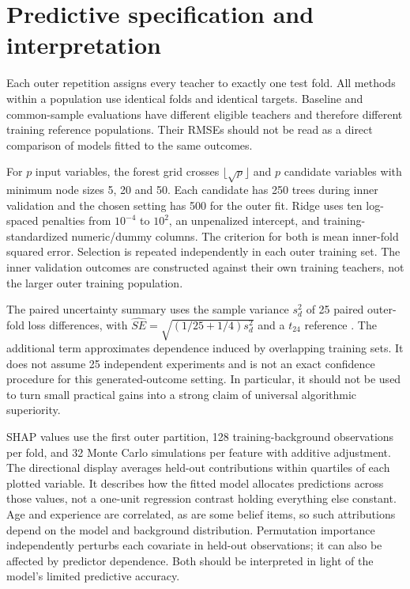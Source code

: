 \section{Predictive specification and interpretation}\label{app:prediction}
\begin{addition}
Each outer repetition assigns every teacher to exactly one test fold. All methods within a population use identical folds and identical targets. Baseline and common-sample evaluations have different eligible teachers and therefore different training reference populations. Their RMSEs should not be read as a direct comparison of models fitted to the same outcomes.

For $p$ input variables, the forest grid crosses $\lfloor\sqrt p\rfloor$ and $p$ candidate variables with minimum node sizes 5, 20 and 50. Each candidate has 250 trees during inner validation and the chosen setting has 500 for the outer fit. Ridge uses ten log-spaced penalties from $10^{-4}$ to $10^2$, an unpenalized intercept, and training-standardized numeric/dummy columns. The criterion for both is mean inner-fold squared error. Selection is repeated independently in each outer training set. The inner validation outcomes are constructed against their own training teachers, not the larger outer training population.

The paired uncertainty summary uses the sample variance $s_d^2$ of 25 paired outer-fold loss differences, with $\widehat{SE}=\sqrt{(1/25+1/4)s_d^2}$ and a $t_{24}$ reference \cite{nadeau}. The additional term approximates dependence induced by overlapping training sets. It does not assume 25 independent experiments and is not an exact confidence procedure for this generated-outcome setting. In particular, it should not be used to turn small practical gains into a strong claim of universal algorithmic superiority.
\end{addition}
\begin{addition}
SHAP values use the first outer partition, 128 training-background observations per fold, and 32 Monte Carlo simulations per feature with additive adjustment. The directional display averages held-out contributions within quartiles of each plotted variable. It describes how the fitted model allocates predictions across those values, not a one-unit regression contrast holding everything else constant. Age and experience are correlated, as are some belief items, so such attributions depend on the model and background distribution. Permutation importance independently perturbs each covariate in held-out observations; it can also be affected by predictor dependence. Both should be interpreted in light of the model's limited predictive accuracy.
\end{addition}
